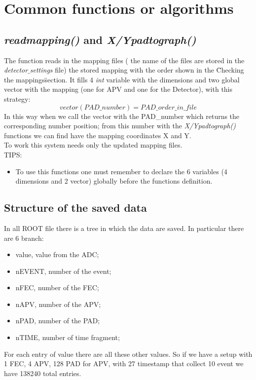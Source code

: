 \documentclass[a4paper,12pt]{article}
\begin{document}
 	\section{Common functions or algorithms}
 		\subsection{\textit{readmapping()} and \textit{X/Ypadtograph()}}
 			The function reads in the mapping files ( the name of the files are stored in the \textit{detector$\_$settings} file) the stored mapping with the order shown in the \"Checking the mappings\" section.
 			It fills 4 \textit{int} variable with the dimensions and two global vector with the mapping (one for APV and one for the Detector), with this strategy: $$vector(PAD\_number)=PAD\_order\_in\_file$$
 			In this way when we call the vector with the PAD\_number which returns the corresponding number position; from this number with the \textit{X/Ypadtograph()} functions we can find have the mapping coordinates X and Y.\\
 			To work this system needs only the updated mapping files.\\
 			TIPS: 
 			\begin{itemize}
 				\item To use this functions one must remember to declare the 6 variables (4 dimensions and 2 vector) globally before the functions definition.
 			\end{itemize}

 		\subsection{Structure of the saved data}
 			In all ROOT file there is a tree in which the data are saved. In particular there are 6 branch:
 			\begin{itemize}
 				\item value, value from the ADC;
    			\item nEVENT, number of the event;
    			\item nFEC, number of the FEC;
    			\item nAPV, number of the APV;
    			\item nPAD, number of the PAD;
    			\item nTIME, number of time fragment;
 			\end{itemize}
 			For each entry of value there are all these other values.
 			So if we have a setup with 1 FEC, 4 APV, 128 PAD for APV, with 27 timestamp that collect 10 event we have 138240 total entries.
\end{document}
